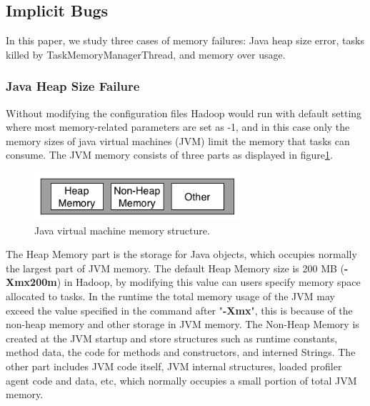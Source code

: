 \subsection{Implicit Bugs}
In this paper, we study three cases of memory failures: Java heap size error, tasks killed by TaskMemoryManagerThread, and memory over usage.
\subsubsection{Java Heap Size Failure}
Without modifying the configuration files Hadoop would run with default setting where most memory-related parameters are set as -1, and in this case only the memory sizes of java virtual machines (JVM) limit the memory that tasks can consume.
The JVM memory consists of three parts as displayed in figure\ref{ref:heap_structure}.
\par
\begin{figure}[ht]
  \centering
    \includegraphics[width=3.0in]{image/Jvm_Heap.png}
    \caption{Java virtual machine memory structure.}
    \label{ref:heap_structure}
\end{figure}
The Heap Memory part is the storage for Java objects, which occupies normally the largest part of JVM memory. The default Heap Memory size is 200 MB ({\bf -Xmx200m}) in Hadoop, by modifying this value can users specify memory space allocated to tasks.
In the runtime the total memory usage of the JVM may exceed the value specified in the command after "{\bf -Xmx}", this is because of the non-heap memory and other storage in JVM memory.
The Non-Heap Memory  is created at the JVM startup and store structures such as runtime constants, method data, the code for methods and constructors, and interned Strings.
The other part includes JVM code itself, JVM internal structures, loaded profiler agent code and data, etc, which normally occupies a small portion of total JVM memory. 


